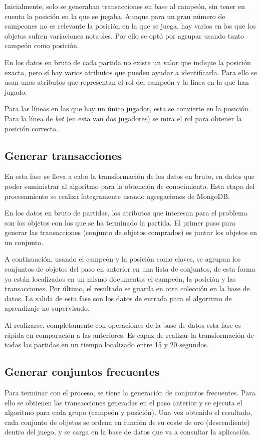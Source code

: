 Inicialmente, solo se generaban transacciones en base al campeón, sin tener en cuenta la posición en la que se jugaba. Aunque para un gran número de campeones no es relevante la posición en la que se juega, hay varios en los que los objetos sufren variaciones notables. Por ello se optó por agrupar usando tanto campeón como posición.

En los datos en bruto de cada partida no existe un valor que indique la posición exacta, pero sí hay varios atributos que pueden ayudar a identificarla. Para ello se usan unos atributos que representan el rol del campeón y la línea en la que han jugado.

Para las líneas en las que hay un único jugador, esta se convierte en la posición. Para la línea de \textit{bot} (en esta van dos jugadores) se mira el rol para obtener la posición correcta.

\subsection{Generar transacciones}
En esta fase se lleva a cabo la transformación de los datos en bruto, en datos que poder suministrar al algoritmo para la obtención de conocimiento. Esta etapa del procesamiento se realiza íntegramente usando agregaciones de MongoDB.

En los datos en bruto de partidas, los atributos que interesan para el problema son los objetos con los que se ha terminado la partida. El primer paso para generar las transacciones (conjunto de objetos comprados) es juntar los objetos en un conjunto.

A continuación, usando el campeón y la posición como claves, se agrupan los conjuntos de objetos del paso en anterior en una lista de conjuntos, de esta forma ya están localizados en un mismo documentos el campeón, la posición y las transacciones. Por último, el resultado se guarda en otra colección en la base de datos. La salida de esta fase son los datos de entrada para el algoritmo de aprendizaje no supervisado.

Al realizarse, completamente con operaciones de la base de datos esta fase es rápida en comparación a las anteriores. Es capaz de realizar la transformación de todas las partidas en un tiempo localizado entre 15 y 20 segundos.

\subsection{Generar conjuntos frecuentes}
Para terminar con el proceso, se tiene la generación de conjuntos frecuentes. Para ello se obtienen las transacciones generadas en el paso anterior y se ejecuta el algoritmo para cada grupo (campeón y posición). Una vez obtenido el resultado, cada conjunto de objetos se ordena en función de su coste de oro (descendiente) dentro del juego, y se carga en la base de datos que va a consultar la aplicación.

